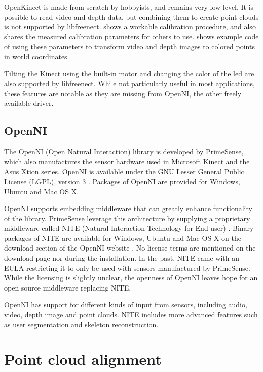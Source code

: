 OpenKinect is made from scratch by hobbyists, and remains very low-level. It is possible to read video and depth data, but combining them to create point clouds is not supported by libfreenect. \citet{burrus2010} shows a workable calibration procedure, and also shares the measured calibration parameters for others to use. \citet{fisher2010} shows example code of using these parameters to transform video and depth images to colored points in world coordinates.

Tilting the Kinect using the built-in motor and changing the color of the led are also supported by libfreenect. While not particularly useful in most applications, these features are notable as they are missing from OpenNI, the other freely available driver.

\subsection{OpenNI}

The OpenNI (Open Natural Interaction) library \citep{OpenNI} is developed by PrimeSense, which also manufactures the sensor hardware used in Microsoft Kinect and the Asus Xtion series. OpenNI is available under the GNU Lesser General Public License (LGPL), version 3 \citep{LGPL3}. Packages of OpenNI are provided for Windows, Ubuntu and Mac OS X.

OpenNI supports embedding middleware that can greatly enhance functionality of the library. PrimeSense leverage this architecture by supplying a proprietary middleware called NITE (Natural Interaction Technology for End-user) \citep{NITE}. Binary packages of NITE are available for Windows, Ubuntu and Mac OS X on the download section of the OpenNI website \citep{OpenNI}. No license terms are mentioned on the download page nor during the installation. In the past, NITE came with an EULA restricting it to only be used with sensors manufactured by PrimeSense. While the licensing is slightly unclear, the openness of OpenNI leaves hope for an open source middleware replacing NITE.

OpenNI has support for different kinds of input from sensors, including audio, video, depth image and point clouds. NITE includes more advanced features such as user segmentation and skeleton reconstruction.


\section{Point cloud alignment} \label{literature.alignment}

